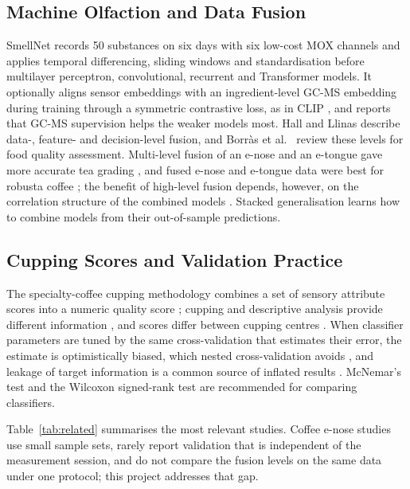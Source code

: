 \subsection{Machine Olfaction and Data Fusion}

SmellNet \cite{feng2026smellnet} records 50 substances on six days with six low-cost MOX channels and applies temporal differencing, sliding windows and standardisation before multilayer perceptron, convolutional, recurrent and Transformer models. It optionally aligns sensor embeddings with an ingredient-level GC-MS embedding during training through a symmetric contrastive loss, as in CLIP \cite{radford2021learning}, and reports that GC-MS supervision helps the weaker models most. Hall and Llinas \cite{hall1997introduction} describe data-, feature- and decision-level fusion, and Borr\`{a}s et al.\ \cite{borras2015data} review these levels for food quality assessment. Multi-level fusion of an e-nose and an e-tongue gave more accurate tea grading \cite{zhi2017framework}, and fused e-nose and e-tongue data were best for robusta coffee \cite{dong2017differentiation}; the benefit of high-level fusion depends, however, on the correlation structure of the combined models \cite{doeswijk2011increase}. Stacked generalisation \cite{wolpert1992stacked} learns how to combine models from their out-of-sample predictions.

\subsection{Cupping Scores and Validation Practice}

The specialty-coffee cupping methodology combines a set of sensory attribute scores into a numeric quality score \cite{revi2019coffee}; cupping and descriptive analysis provide different information \cite{didonfrancesco2014comparison}, and scores differ between cupping centres \cite{worku2016reproducibility}. When classifier parameters are tuned by the same cross-validation that estimates their error, the estimate is optimistically biased, which nested cross-validation avoids \cite{varma2006bias,cawley2010overfitting}, and leakage of target information is a common source of inflated results \cite{kaufman2012leakage}. McNemar's test \cite{dietterich1998approximate} and the Wilcoxon signed-rank test \cite{demsar2006statistical} are recommended for comparing classifiers.

Table~\ref{tab:related} summarises the most relevant studies. Coffee e-nose studies use small sample sets, rarely report validation that is independent of the measurement session, and do not compare the fusion levels on the same data under one protocol; this project addresses that gap.

